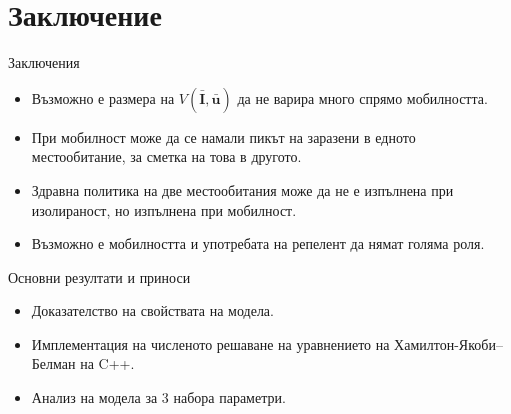 \section{\hspace{1em}Заключение}
\begin{frame}[c]{Заключения}
  \begin{itemize}
    \item Възможно е размера на $V(\bar{\boldsymbol{I}}, \bar{\boldsymbol{u}})$ да не варира много спрямо мобилността.
    \item При мобилност може да се намали пикът на заразени в едното местообитание, за сметка на това в другото.
    \item Здравна политика на две местообитания може да не е изпълнена при изолираност, но изпълнена при мобилност.
    \item Възможно е мобилността и употребата на репелент да нямат голяма роля.
  \end{itemize}
\end{frame}

\begin{frame}[c]{Основни резултати и приноси}
  \begin{itemize}
    \item Доказателство на свойствата на модела.
    \item Имплементация на численото решаване на уравнението на Хамилтон-Якоби–Белман на C++.
    \item Анализ на модела за 3 набора параметри.
  \end{itemize}
\end{frame}
